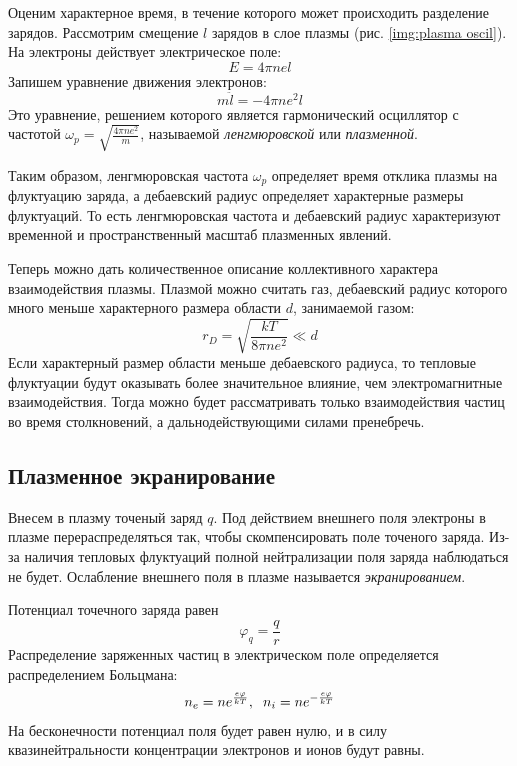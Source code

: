 Оценим характерное время, в течение которого может происходить разделение зарядов. Рассмотрим смещение $l$ зарядов в слое плазмы (рис. \ref{img:plasma oscil}). На электроны действует электрическое поле:
$$
E = 4 \pi n e l
$$
Запишем уравнение движения электронов:
$$m \ddot{l} = -4 \pi n e^2 l$$
Это уравнение, решением которого является гармонический осциллятор с частотой $\omega_p = \sqrt{\frac{4\pi n e^2}{m}}$, называемой \textit{ленгмюровской} или \textit{плазменной}. 

Таким образом, ленгмюровская частота $\omega_p$ определяет время отклика плазмы на флуктуацию заряда, а дебаевский радиус определяет характерные размеры флуктуаций. То есть ленгмюровская частота и дебаевский радиус характеризуют временной и пространственный масштаб плазменных явлений.

Теперь можно дать количественное описание коллективного характера взаимодействия плазмы. Плазмой можно считать газ, дебаевский радиус которого много меньше характерного размера области $d$, занимаемой газом:
$$
r_D = \sqrt{\frac{kT}{8 \pi n e^2}} \ll d
$$
Если характерный размер области меньше дебаевского радиуса, то тепловые флуктуации будут оказывать более значительное влияние, чем электромагнитные взаимодействия. Тогда можно будет рассматривать только взаимодействия частиц во время столкновений, а дальнодействующими силами пренебречь.

\subsection*{Плазменное экранирование}

Внесем в плазму точеный заряд $q$. Под действием внешнего поля электроны в плазме перераспределяться так, чтобы скомпенсировать поле точеного заряда. Из-за наличия тепловых флуктуаций полной нейтрализации поля заряда наблюдаться не будет. Ослабление внешнего поля в плазме называется \textit{экранированием}.

Потенциал точечного заряда равен
$$\varphi_q = \frac{q}{r}$$
Распределение заряженных частиц в электрическом поле определяется распределением Больцмана:
$$
n_e = n e^{\frac{e \varphi}{kT}}, \hspace{2mm} n_i = n e^{-\frac{e \varphi}{kT}}
$$
На бесконечности потенциал поля будет равен нулю, и в силу квазинейтральности концентрации электронов и ионов будут равны.

